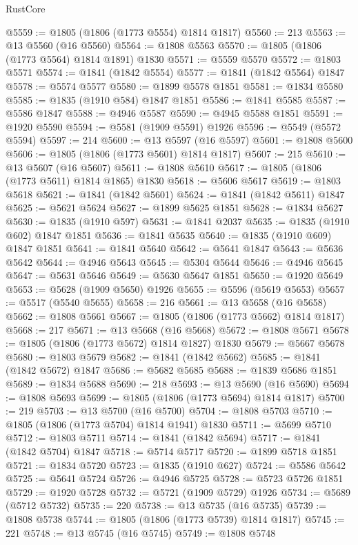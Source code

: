 \begin{lexlean}{RustCore}
\begin{coremodule}
@5559 := @1805 (@1806 (@1773 @5554) @1814 @1817)
@5560 := 213
@5563 := @13 @5560 (@16 @5560)
@5564 := @1808 @5563
@5570 := @1805 (@1806 (@1773 @5564) @1814 @1891) @1830
@5571 := @5559 @5570
@5572 := @1803 @5571
@5574 := @1841 (@1842 @5554)
@5577 := @1841 (@1842 @5564) @1847
@5578 := @5574 @5577
@5580 := @1899 @5578 @1851
@5581 := @1834 @5580
@5585 := @1835 (@1910 @584) @1847 @1851
@5586 := @1841 @5585
@5587 := @5586 @1847
@5588 := @4946 @5587
@5590 := @4945 @5588 @1851
@5591 := @1920 @5590
@5594 := @5581 (@1909 @5591) @1926
@5596 := @5549 (@5572 @5594)
@5597 := 214
@5600 := @13 @5597 (@16 @5597)
@5601 := @1808 @5600
@5606 := @1805 (@1806 (@1773 @5601) @1814 @1817)
@5607 := 215
@5610 := @13 @5607 (@16 @5607)
@5611 := @1808 @5610
@5617 := @1805 (@1806 (@1773 @5611) @1814 @1865) @1830
@5618 := @5606 @5617
@5619 := @1803 @5618
@5621 := @1841 (@1842 @5601)
@5624 := @1841 (@1842 @5611) @1847
@5625 := @5621 @5624
@5627 := @1899 @5625 @1851
@5628 := @1834 @5627
@5630 := @1835 (@1910 @597)
@5631 := @1841 @2037
@5635 := @1835 (@1910 @602) @1847 @1851
@5636 := @1841 @5635
@5640 := @1835 (@1910 @609) @1847 @1851
@5641 := @1841 @5640
@5642 := @5641 @1847
@5643 := @5636 @5642
@5644 := @4946 @5643
@5645 := @5304 @5644
@5646 := @4946 @5645
@5647 := @5631 @5646
@5649 := @5630 @5647 @1851
@5650 := @1920 @5649
@5653 := @5628 (@1909 @5650) @1926
@5655 := @5596 (@5619 @5653)
@5657 := @5517 (@5540 @5655)
@5658 := 216
@5661 := @13 @5658 (@16 @5658)
@5662 := @1808 @5661
@5667 := @1805 (@1806 (@1773 @5662) @1814 @1817)
@5668 := 217
@5671 := @13 @5668 (@16 @5668)
@5672 := @1808 @5671
@5678 := @1805 (@1806 (@1773 @5672) @1814 @1827) @1830
@5679 := @5667 @5678
@5680 := @1803 @5679
@5682 := @1841 (@1842 @5662)
@5685 := @1841 (@1842 @5672) @1847
@5686 := @5682 @5685
@5688 := @1839 @5686 @1851
@5689 := @1834 @5688
@5690 := 218
@5693 := @13 @5690 (@16 @5690)
@5694 := @1808 @5693
@5699 := @1805 (@1806 (@1773 @5694) @1814 @1817)
@5700 := 219
@5703 := @13 @5700 (@16 @5700)
@5704 := @1808 @5703
@5710 := @1805 (@1806 (@1773 @5704) @1814 @1941) @1830
@5711 := @5699 @5710
@5712 := @1803 @5711
@5714 := @1841 (@1842 @5694)
@5717 := @1841 (@1842 @5704) @1847
@5718 := @5714 @5717
@5720 := @1899 @5718 @1851
@5721 := @1834 @5720
@5723 := @1835 (@1910 @627)
@5724 := @5586 @5642
@5725 := @5641 @5724
@5726 := @4946 @5725
@5728 := @5723 @5726 @1851
@5729 := @1920 @5728
@5732 := @5721 (@1909 @5729) @1926
@5734 := @5689 (@5712 @5732)
@5735 := 220
@5738 := @13 @5735 (@16 @5735)
@5739 := @1808 @5738
@5744 := @1805 (@1806 (@1773 @5739) @1814 @1817)
@5745 := 221
@5748 := @13 @5745 (@16 @5745)
@5749 := @1808 @5748

\end{coremodule}
\end{lexlean}
